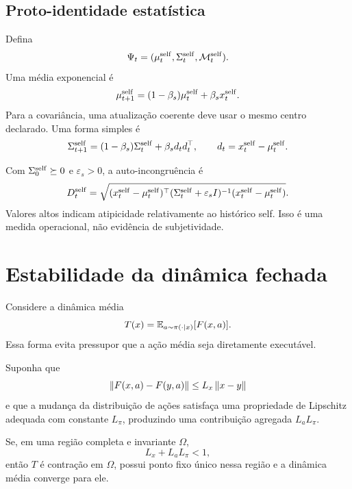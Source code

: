 \subsection{Proto-identidade estatística}

Defina
\begin{equation}
\Psi_t=(\mu_t^{\rm self},\Sigma_t^{\rm self},\mathcal M_t^{\rm self}).
\end{equation}
Uma média exponencial é
\begin{equation}
\mu_{t+1}^{\rm self}
=(1-\beta_s)\mu_t^{\rm self}+\beta_sx_t^{\rm self}.
\end{equation}
Para a covariância, uma atualização coerente deve usar o mesmo centro declarado. Uma forma simples é
\begin{equation}
\Sigma_{t+1}^{\rm self}
=(1-\beta_s)\Sigma_t^{\rm self}
+\beta_s d_td_t^\top,
\qquad
d_t=x_t^{\rm self}-\mu_t^{\rm self}.
\end{equation}

Com \(\Sigma_0^{\rm self}\succeq0\) e \(\varepsilon_s>0\), a auto-incongruência é
\begin{equation}
D_t^{\rm self}
=\sqrt{
(x_t^{\rm self}-\mu_t^{\rm self})^\top
(\Sigma_t^{\rm self}+\varepsilon_sI)^{-1}
(x_t^{\rm self}-\mu_t^{\rm self})
}.
\end{equation}
Valores altos indicam atipicidade relativamente ao histórico self. Isso é uma medida operacional, não evidência de subjetividade.

\section{Estabilidade da dinâmica fechada}

Considere a dinâmica média
\begin{equation}
T(x)=\operatorname{\mathbb{E}}_{a\sim\pi(\cdot\mid x)}[F(x,a)].
\label{eq:mean_closed_loop}
\end{equation}
Essa forma evita pressupor que a ação média seja diretamente executável.

Suponha que
\begin{equation}
\left\lVert F(x,a)-F(y,a) \right\rVert\le L_x\left\lVert x-y \right\rVert
\end{equation}
e que a mudança da distribuição de ações satisfaça uma propriedade de Lipschitz adequada com constante \(L_\pi\), produzindo uma contribuição agregada \(L_aL_\pi\).

\begin{proposition}
Se, em uma região completa e invariante \(\Omega\),
\begin{equation}
L_x+L_aL_\pi<1,
\end{equation}
então \(T\) é contração em \(\Omega\), possui ponto fixo único nessa região e a dinâmica média converge para ele.
\end{proposition}

